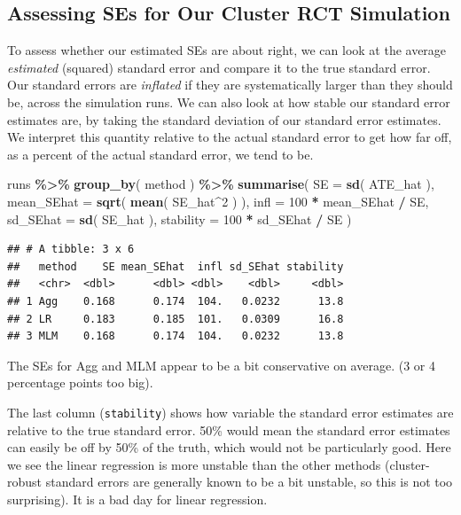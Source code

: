 \documentclass[
]{book}
\newenvironment{Shaded}{\begin{snugshade}}{\end{snugshade}}
\newcommand{\AttributeTok}[1]{\textcolor[rgb]{0.13,0.29,0.53}{#1}}
\newcommand{\DecValTok}[1]{\textcolor[rgb]{0.00,0.00,0.81}{#1}}
\newcommand{\FunctionTok}[1]{\textcolor[rgb]{0.13,0.29,0.53}{\textbf{#1}}}
\newcommand{\NormalTok}[1]{#1}
\newcommand{\SpecialCharTok}[1]{\textcolor[rgb]{0.81,0.36,0.00}{\textbf{#1}}}
\begin{document}
\subsection{Assessing SEs for Our Cluster RCT Simulation}\label{assessing-ses-for-our-cluster-rct-simulation}

To assess whether our estimated SEs are about right, we can look at the average \emph{estimated} (squared) standard error and compare it to the true standard error.
Our standard errors are \emph{inflated} if they are systematically larger than they should be, across the simulation runs.
We can also look at how stable our standard error estimates are, by taking the standard deviation of our standard error estimates.
We interpret this quantity relative to the actual standard error to get how far off, as a percent of the actual standard error, we tend to be.

\begin{Shaded}
\begin{Highlighting}[]
\NormalTok{runs }\SpecialCharTok{\%\textgreater{}\%}  \FunctionTok{group\_by}\NormalTok{( method ) }\SpecialCharTok{\%\textgreater{}\%}
  \FunctionTok{summarise}\NormalTok{( }
    \AttributeTok{SE =} \FunctionTok{sd}\NormalTok{( ATE\_hat ),}
    \AttributeTok{mean\_SEhat =} \FunctionTok{sqrt}\NormalTok{( }\FunctionTok{mean}\NormalTok{( SE\_hat}\SpecialCharTok{\^{}}\DecValTok{2}\NormalTok{ ) ),}
    \AttributeTok{infl =} \DecValTok{100} \SpecialCharTok{*}\NormalTok{ mean\_SEhat }\SpecialCharTok{/}\NormalTok{ SE,}
    \AttributeTok{sd\_SEhat =} \FunctionTok{sd}\NormalTok{( SE\_hat ),}
    \AttributeTok{stability =} \DecValTok{100} \SpecialCharTok{*}\NormalTok{ sd\_SEhat }\SpecialCharTok{/}\NormalTok{ SE )}
\end{Highlighting}
\end{Shaded}

\begin{verbatim}
## # A tibble: 3 x 6
##   method    SE mean_SEhat  infl sd_SEhat stability
##   <chr>  <dbl>      <dbl> <dbl>    <dbl>     <dbl>
## 1 Agg    0.168      0.174  104.   0.0232      13.8
## 2 LR     0.183      0.185  101.   0.0309      16.8
## 3 MLM    0.168      0.174  104.   0.0232      13.8
\end{verbatim}

The SEs for Agg and MLM appear to be a bit conservative on average. (3 or 4 percentage points too big).

The last column (\texttt{stability}) shows how variable the standard error estimates are relative to the true standard error.
50\% would mean the standard error estimates can easily be off by 50\% of the truth, which would not be particularly good.
Here we see the linear regression is more unstable than the other methods (cluster-robust standard errors are generally known to be a bit unstable, so this is not too surprising).
It is a bad day for linear regression.
\end{document}
